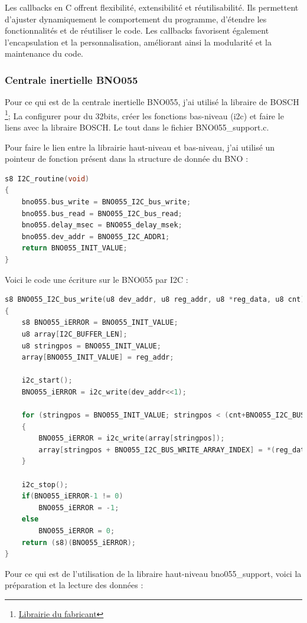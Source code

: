{{	Les callbacks en C offrent flexibilité, extensibilité et réutilisabilité. Ils permettent d'ajuster dynamiquement le comportement du programme, d'étendre les fonctionnalités et de réutiliser le code. Les callbacks favorisent également l'encapsulation et la personnalisation, améliorant ainsi la modularité et la maintenance du code.	
	}
	
	\clearpage
	\subsubsection{Centrale inertielle BNO055}
	Pour ce qui est de la centrale inertielle BNO055, j'ai utilisé la libraire de BOSCH \footnote{\href{https://github.com/BoschSensortec/BNO055_driver}{Librairie du fabricant}}; La configurer pour du 32bits, créer les fonctions bas-niveau (i2c) et faire le liens avec la libraire BOSCH. Le tout dans le fichier BNO055\_support.c.
	
	Pour faire le lien entre la librairie haut-niveau et bas-niveau, j'ai utilisé un pointeur de fonction présent dans la structure de donnée du BNO :
	
\begin{lstlisting}[frame=single, language=C, caption={Code lien pointeur de fonction}, captionpos=b]
s8 I2C_routine(void)
{
	bno055.bus_write = BNO055_I2C_bus_write;
	bno055.bus_read = BNO055_I2C_bus_read;
	bno055.delay_msec = BNO055_delay_msek;
	bno055.dev_addr = BNO055_I2C_ADDR1;
	return BNO055_INIT_VALUE;
}
\end{lstlisting}

	Voici le code une écriture sur le BNO055 par I2C :
\begin{lstlisting}[frame=single, language=C, caption={Code écriture au BNO055}, captionpos=b, breaklines=true]
s8 BNO055_I2C_bus_write(u8 dev_addr, u8 reg_addr, u8 *reg_data, u8 cnt)
{
	s8 BNO055_iERROR = BNO055_INIT_VALUE;
	u8 array[I2C_BUFFER_LEN];
	u8 stringpos = BNO055_INIT_VALUE;
	array[BNO055_INIT_VALUE] = reg_addr;
	
	i2c_start();
	BNO055_iERROR = i2c_write(dev_addr<<1);
	
	for (stringpos = BNO055_INIT_VALUE; stringpos < (cnt+BNO055_I2C_BUS_WRITE_ARRAY_INDEX); stringpos++)
	{
		BNO055_iERROR = i2c_write(array[stringpos]);
		array[stringpos + BNO055_I2C_BUS_WRITE_ARRAY_INDEX] = *(reg_data + stringpos);
	}
	
	i2c_stop();
	if(BNO055_iERROR-1 != 0)
		BNO055_iERROR = -1;
	else
		BNO055_iERROR = 0;
	return (s8)(BNO055_iERROR);
}
\end{lstlisting}
	Pour ce qui est de l'utilisation de la libraire haut-niveau bno055\_support, voici la préparation et la lecture des données : 
	
}
